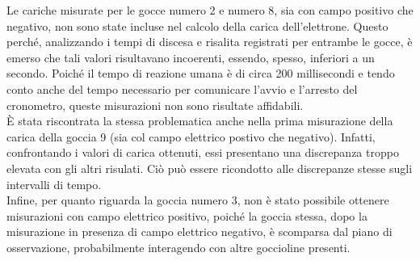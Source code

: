 \documentclass{article}
\begin{document}
Le cariche misurate per le gocce numero 2 e numero 8, sia con campo positivo che negativo, non sono state incluse nel calcolo della carica dell'elettrone. Questo perché, analizzando i tempi di discesa e risalita registrati per entrambe le gocce, è emerso che tali valori risultavano incoerenti, essendo, spesso, inferiori a un secondo. Poiché il tempo di reazione umana è di circa 200 millisecondi e tendo conto anche del tempo necessario per comunicare l'avvio e l'arresto del cronometro, queste misurazioni non sono risultate affidabili.\\

È stata riscontrata la stessa problematica anche nella prima misurazione della carica della goccia 9 (sia col campo elettrico postivo che negativo). Infatti, confrontando i valori di carica ottenuti, essi presentano una discrepanza troppo elevata con gli altri risulati. Ciò può essere ricondotto alle discrepanze stesse sugli intervalli di tempo.\\

Infine, per quanto riguarda la goccia numero 3, non è stato possibile ottenere misurazioni con campo elettrico positivo, poiché la goccia stessa, dopo la misurazione in presenza di campo elettrico negativo, è scomparsa dal piano di osservazione, probabilmente interagendo con altre goccioline presenti.
\end{document}
